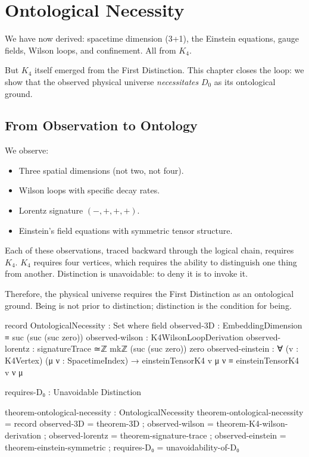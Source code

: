 \documentclass[11pt,a4paper]{book}
\begin{document}
\chapter{Ontological Necessity}

We have now derived: spacetime dimension (3+1), the Einstein equations, gauge fields, 
Wilson loops, and confinement. All from $K_4$.

But $K_4$ itself emerged from the First Distinction. This chapter closes the loop: we show 
that the observed physical universe \emph{necessitates} $D_0$ as its ontological ground.

\section{From Observation to Ontology}

We observe:
\begin{itemize}
\item Three spatial dimensions (not two, not four).
\item Wilson loops with specific decay rates.
\item Lorentz signature $(-,+,+,+)$.
\item Einstein's field equations with symmetric tensor structure.
\end{itemize}

Each of these observations, traced backward through the logical chain, requires $K_4$.
$K_4$ requires four vertices, which requires the ability to distinguish one thing from another.
Distinction is unavoidable: to deny it is to invoke it.

Therefore, the physical universe requires the First Distinction as an ontological ground. 
Being is not prior to distinction; distinction is the condition for being.

\begin{code}
record OntologicalNecessity : Set where
  field
    observed-3D          : EmbeddingDimension ≡ suc (suc (suc zero))
    observed-wilson      : K4WilsonLoopDerivation
    observed-lorentz     : signatureTrace ≃ℤ mkℤ (suc (suc zero)) zero
    observed-einstein    : ∀ (v : K4Vertex) (μ ν : SpacetimeIndex) → 
                           einsteinTensorK4 v μ ν ≡ einsteinTensorK4 v ν μ
    
    requires-D₀ : Unavoidable Distinction

theorem-ontological-necessity : OntologicalNecessity
theorem-ontological-necessity = record
  { observed-3D          = theorem-3D
  ; observed-wilson      = theorem-K4-wilson-derivation
  ; observed-lorentz     = theorem-signature-trace
  ; observed-einstein    = theorem-einstein-symmetric
  ; requires-D₀          = unavoidability-of-D₀
  }
\end{code}
\end{document}
